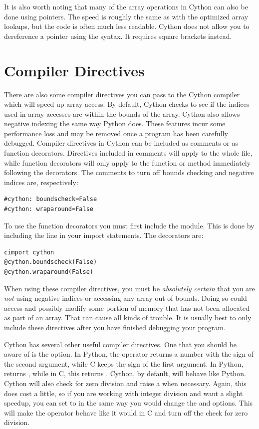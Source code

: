 It is also worth noting that many of the array operations in Cython can also be done using pointers.
The speed is roughly the same as with the optimized array lookups, but the code is often much less readable.
Cython does not allow you to dereference a pointer using the \li{*} syntax.
It requires square brackets \li{[ ]} instead.

\section*{Compiler Directives}
There are also some compiler directives you can pass to the Cython compiler which will speed up array access.
By default, Cython checks to see if the indices used in array accesses are within the bounds of the array.
Cython also allows negative indexing the same way Python does.
These features incur some performance loss and may be removed once a program has been carefully debugged.
Compiler directives in Cython can be included as comments or as function decorators.
Directives included in comments will apply to the whole file, while function decorators will only apply to the function or method immediately following the decorators.
The comments to turn off bounds checking and negative indices are, respectively:
\begin{lstlisting}
#cython: boundscheck=False
#cython: wraparound=False
\end{lstlisting}
To use the function decorators you must first include the  module.
This is done by including the line  in your import statements.
The decorators are:
\begin{lstlisting}
cimport cython
@cython.boundscheck(False)
@cython.wraparound(False)
\end{lstlisting}
When using these compiler directives, you must be \emph{absolutely certain} that you are \emph{not} using negative indices or accessing any array out of bounds.
Doing so could access and possibly modify some portion of memory that has not been allocated as part of an array.
That can cause all kinds of trouble.
It is usually best to only include these directives after you have finished debugging your program.

Cython has several other useful compiler directives.
One that you should be aware of is the  option.
In Python, the \li{\%} operator returns a number with the sign of the second argument, while C keeps the sign of the first argument.
In Python,  returns , while in C, this returns .
Cython, by default, will behave like Python.
Cython will also check for zero division and raise a  when necessary.
Again, this does cost a little, so if you are working with integer division and want a slight speedup, you can set  to  in the same way you would change the  and  options.
This will make the \li{\%} operator behave like it would in C and turn off the check for zero division.

